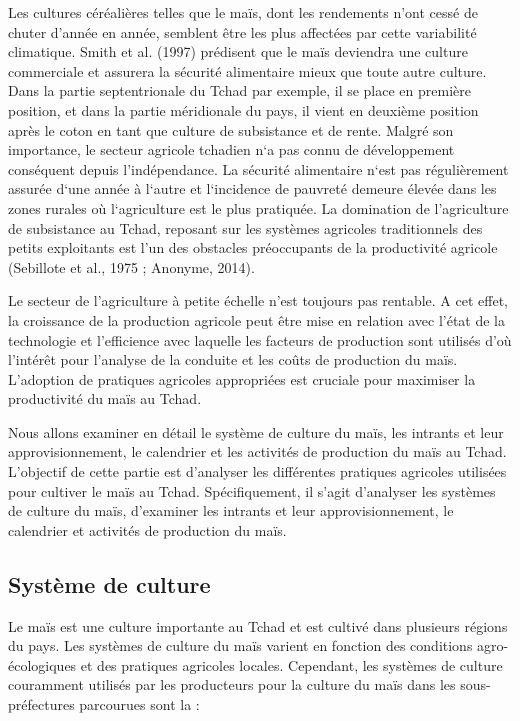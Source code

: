 \documentclass[12pt,oneside]{report}
\begin{document}
Les cultures céréalières telles que le maïs, dont les rendements n’ont cessé de chuter d’année en année, semblent être les plus affectées par cette variabilité climatique. Smith et al. (1997) prédisent que le maïs deviendra une culture commerciale et assurera la sécurité alimentaire mieux que toute autre culture. Dans la partie septentrionale du Tchad par exemple, il se place en première position, et dans la partie méridionale du pays, il vient en deuxième position après le coton en tant que culture de subsistance et de rente. Malgré son importance, le secteur agricole tchadien n‘a pas connu de développement conséquent depuis l’indépendance. La sécurité alimentaire n‘est pas régulièrement assurée d‘une année à l‘autre et l‘incidence de pauvreté demeure élevée dans les zones rurales où l‘agriculture est le plus pratiquée. La domination de l’agriculture de subsistance au Tchad, reposant sur les systèmes agricoles traditionnels des petits exploitants est l’un des obstacles préoccupants de la productivité agricole (Sebillote et al., 1975 ; Anonyme, 2014).

Le secteur de l’agriculture à petite échelle n’est toujours pas rentable. A cet effet, la croissance de la production agricole peut être mise en relation avec l'état de la technologie et l’efficience avec laquelle les facteurs de production sont utilisés d’où l’intérêt pour l’analyse de la conduite et les coûts de production du maïs. L'adoption de pratiques agricoles appropriées est cruciale pour maximiser la productivité du maïs au Tchad.

Nous allons examiner en détail le système de culture du maïs, les intrants et leur approvisionnement, le calendrier et les activités de production du maïs au Tchad. L'objectif de cette partie est d'analyser les différentes pratiques agricoles utilisées pour cultiver le maïs au Tchad. Spécifiquement, il s’agit d’analyser les systèmes de culture du maïs, d’examiner les intrants et leur approvisionnement, le calendrier et activités de production du maïs.

\subsection{Système de culture}
Le maïs est une culture importante au Tchad et est cultivé dans plusieurs régions du pays. Les systèmes de culture du maïs varient en fonction des conditions agro-écologiques et des pratiques agricoles locales. Cependant, les systèmes de culture couramment utilisés par les producteurs pour la culture du maïs dans les sous-préfectures parcourues sont la :
\end{document}

